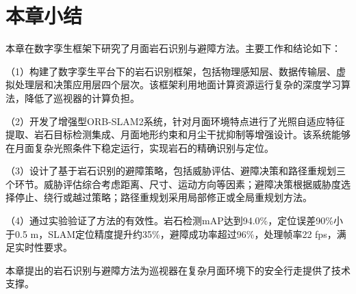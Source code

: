 \section{本章小结}
\label{sec:ch5_summary}

本章在数字孪生框架下研究了月面岩石识别与避障方法。主要工作和结论如下：

（1）构建了数字孪生平台下的岩石识别框架，包括物理感知层、数据传输层、虚拟处理层和决策应用层四个层次。该框架利用地面计算资源运行复杂的深度学习算法，降低了巡视器的计算负担。

（2）开发了增强型ORB-SLAM2系统，针对月面环境特点进行了光照自适应特征提取、岩石目标检测集成、月面地形约束和月尘干扰抑制等增强设计。该系统能够在月面复杂光照条件下稳定运行，实现岩石的精确识别与定位。

（3）设计了基于岩石识别的避障策略，包括威胁评估、避障决策和路径重规划三个环节。威胁评估综合考虑距离、尺寸、运动方向等因素；避障决策根据威胁度选择停止、绕行或越过策略；路径重规划采用局部修正或全局重规划方法。

（4）通过实验验证了方法的有效性。岩石检测mAP达到94.0\%，定位误差90\%小于0.5 m，SLAM定位精度提升约35\%，避障成功率超过96\%，处理帧率22 fps，满足实时性要求。

本章提出的岩石识别与避障方法为巡视器在复杂月面环境下的安全行走提供了技术支撑。

